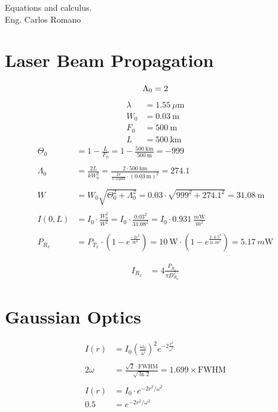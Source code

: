 \documentclass[a4paper]{article}
\begin{document}
\begin{center}
\large{Equations and calculus.}\\
\small{Eng. Carlos Romano}\\
\end{center}
\section{Laser Beam Propagation}
\begin{equation}
\Lambda_0 = 2\\
\end{equation}
\begin{align*}
\lambda &= 1.55 \ \mu\textrm{m}\\
W_0 &= 0.03 \ \textrm{m} \\
F_0 &= 500 \ \textrm{m}\\
L &= 500 \ \textrm{km}
\end{align*}
\begin{align*}
\Theta_0 &= 1-\frac{L}{F_0} = 1 - \frac{500 \ \textrm{km}}{500\ \textrm{m} }= -999
\\
\\
\Lambda_0 &= \frac{2L}{kW_0^2}  = \frac{2\cdot 500\ \textrm{km}}{\frac{2\pi}{1.55\mu\textrm{m}}\cdot (0.03\ \textrm{m})^2} = 274.1
\\
\\
W &= W_0\sqrt{\Theta_0^2+\Lambda_0^2} = 0.03\cdot\sqrt{999^2+274.1^2} = 31.08 \ \textrm{m}
\\
\\
I(0,L) &= I_0\cdot \frac{W_0^2}{W^2} = I_0\cdot\frac{0.03^2}{31.08^2} = I_0\cdot 0.931\ \frac{m\textrm{W}}{\textrm{m}^2}
\\
\\
P_{R_x} &= P_{T_x}\cdot \left(1-e^\frac{-2r^2}{W^2}\right) = 10\ \textrm{W}\cdot \left(1-e^\frac{2\cdot0.5^2}{31.08^2}\right) = 5.17\ m\textrm{W}
\end{align*}

\begin{align*}
I_{R_x} &= 4\frac{P_{R_x}}{\pi D_{R_x}^2}
\end{align*}

\section*{Gaussian Optics}
\begin{align*}
I(r) &= I_0 \left(\frac{\omega_0}{\omega}\right)^2 e^{-2\frac{r^2}{\omega^2}} \\
\\
2\omega &= \frac{\sqrt{2}\cdot \textrm{FWHM}}{\sqrt{\ln 2}} = 1.699\times \textrm{FWHM}
\\
\\
I(r) &= I_0 \cdot e^{-2r^2/\omega^2} \\
0.5 &= e^{-2r^2/\omega^2}
\end{align*}
\end{document}
